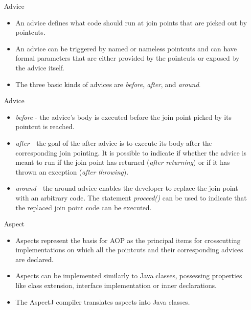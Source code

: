 \documentclass[11pt]{beamer}
\begin{document}
\begin{frame}{Advice}
  \begin{itemize}
    \item An advice defines what code should run at join points that are picked out by pointcuts.
    \item An advice can be triggered by named or nameless pointcuts and can have formal parameters that are either provided by the pointcuts or exposed by the advice itself.
    \item The three basic kinds of advices are \emph{before}, \emph{after}, and \emph{around}.
  \end{itemize}
\end{frame}

\begin{frame}{Advice}
  \begin{itemize}
    \item \emph{before} - the advice’s body is executed before the join point picked by its pointcut is reached. 
    \item \emph{after} - the goal of the after advice is to execute its body after the corresponding join pointing. It is possible to indicate if whether the advice is meant to run if the join point has returned (\emph{after returning}) or if it has thrown an exception (\emph{after throwing}).
    \item \emph{around} - the around advice enables the developer to replace the join point with an arbitrary code. The statement \emph{proceed()} can be used to indicate that the replaced join point code can be executed.
  \end{itemize}
\end{frame}

\begin{frame}{Aspect}
  \begin{itemize}
    \item Aspects represent the basis for AOP as the principal items for crosscutting implementations on which all the pointcuts and their corresponding advices are declared.
    \item Aspects can be implemented similarly to Java classes, possessing properties like class extension, interface implementation or inner declarations.
    \item The AspectJ compiler translates aspects into Java classes.
  \end{itemize}
\end{frame}

\end{document}
